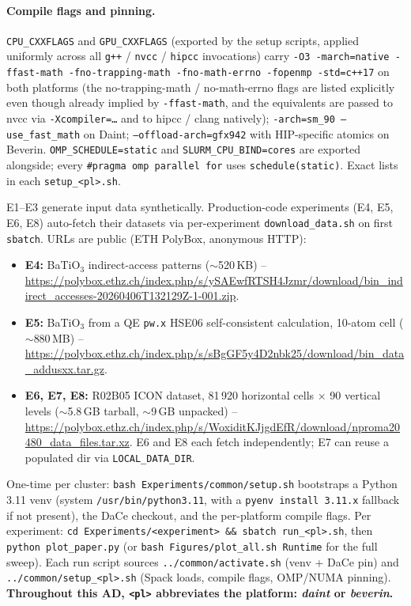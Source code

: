 \documentclass[conference]{IEEEtran}
\begin{document}
\paragraph{Compile flags and pinning.} \texttt{CPU\_CXXFLAGS} and \texttt{GPU\_CXXFLAGS} (exported by the setup scripts, applied uniformly across all \texttt{g++} / \texttt{nvcc} / \texttt{hipcc} invocations) carry \texttt{-O3 -march=native -ffast-math -fno-trapping-math -fno-math-errno -fopenmp -std=c++17} on both platforms (the no-trapping-math / no-math-errno flags are listed explicitly even though already implied by \texttt{-ffast-math}, and the equivalents are passed to nvcc via \texttt{-Xcompiler=\ldots} and to hipcc / clang natively); \texttt{-arch=sm\_90 --use\_fast\_math} on Daint; \texttt{--offload-arch=gfx942} with HIP-specific atomics on Beverin. \texttt{OMP\_SCHEDULE=static} and \texttt{SLURM\_CPU\_BIND=cores} are exported alongside; every \texttt{\#pragma omp parallel for} uses \texttt{schedule(static)}. Exact lists in each \texttt{setup\_<pl>.sh}.


E1--E3 generate input data synthetically. Production-code experiments (E4, E5, E6, E8) auto-fetch their datasets via per-experiment \texttt{download\_data.sh} on first \texttt{sbatch}. URLs are public (ETH PolyBox, anonymous HTTP):

\begin{itemize}
\item \textbf{E4:} BaTiO$_3$ indirect-access patterns ($\sim$520\,KB) -- \url{https://polybox.ethz.ch/index.php/s/ySAEwfRTSH4Jzmr/download/bin_indirect_accesses-20260406T132129Z-1-001.zip}.
\item \textbf{E5:} BaTiO$_3$ from a QE \texttt{pw.x} HSE06 self-consistent calculation, 10-atom cell ($\sim$880\,MB) -- \url{https://polybox.ethz.ch/index.php/s/sBgGF5y4D2nbk25/download/bin_data_addusxx.tar.gz}.
\item \textbf{E6, E7, E8:} R02B05 ICON dataset, 81\,920 horizontal cells $\times$ 90 vertical levels ($\sim$5.8\,GB tarball, $\sim$9\,GB unpacked) -- \url{https://polybox.ethz.ch/index.php/s/WoxiditKJjgdEfR/download/nproma20480_data_files.tar.xz}. E6 and E8 each fetch independently; E7 can reuse a populated dir via \texttt{LOCAL\_DATA\_DIR}.
\end{itemize}


One-time per cluster: \texttt{bash Experiments/common/setup.sh} bootstraps a Python 3.11 venv (system \texttt{/usr/bin/python3.11}, with a \texttt{pyenv install 3.11.x} fallback if not present), the DaCe checkout, and the per-platform compile flags. Per experiment: \texttt{cd Experiments/<experiment> \&\& sbatch run\_<pl>.sh}, then \texttt{python plot\_paper.py} (or \texttt{bash Figures/plot\_all.sh Runtime} for the full sweep). Each run script sources \texttt{../common/activate.sh} (venv + DaCe pin) and \texttt{../common/setup\_<pl>.sh} (Spack loads, compile flags, OMP/NUMA pinning). \textbf{Throughout this AD, \texttt{<pl>} abbreviates the platform: \emph{daint} or \emph{beverin}.}
\end{document}
